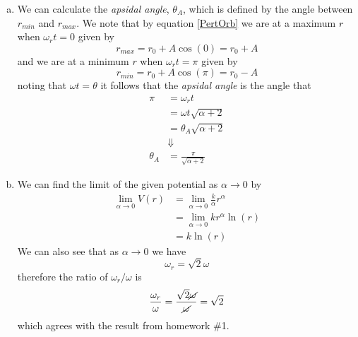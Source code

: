 \documentclass[11pt]{article}
\numberwithin{equation}{section}
\begin{document}
\begin{enumerate}[(a)]
\item We can calculate the \emph{apsidal angle}, $\theta_A$, which is defined by the angle
between $r_{min}$ and $r_{max}$. We note that by equation \ref{PertOrb} we are at a maximum 
$r$ when $\omega_rt=0$ given by
$$r_{max} = r_0+A\cos(0) = r_0+A$$
and we are at a minimum $r$ when $\omega_rt=\pi$ given by
$$r_{min} = r_0+A\cos(\pi) = r_0-A$$
noting that $\omega t=\theta$ it follows that the \emph{apsidal angle} is the angle that
\begin{align*}
\pi &= \omega_rt\\
&= \omega t\sqrt{\alpha+2}\\
&= \theta_A\sqrt{\alpha+2}\\
&\Downarrow\\
\theta_A &= \frac{\pi}{\sqrt{\alpha+2}}
\end{align*}

\item We can find the limit of the given potential as $\alpha\rightarrow0$ by
\begin{align*}
\lim_{\alpha\rightarrow0}V(r) &= \lim_{\alpha\rightarrow0}\frac{k}{\alpha}r^{\alpha}\\
&= \lim_{\alpha\rightarrow0}kr^{\alpha}\ln(r)\\
&= k\ln(r)
\end{align*}
We can also see that as $\alpha\rightarrow0$ we have
$$\omega_r = \sqrt{2}\omega$$
therefore the ratio of $\omega_r/\omega$ is
$$\frac{\omega_r}{\omega} = \frac{\sqrt{2}\cancel{\omega}}{\cancel{\omega}} = \sqrt{2}$$
which agrees with the result from homework \#1.
\end{enumerate}

\pagebreak
\end{document}
